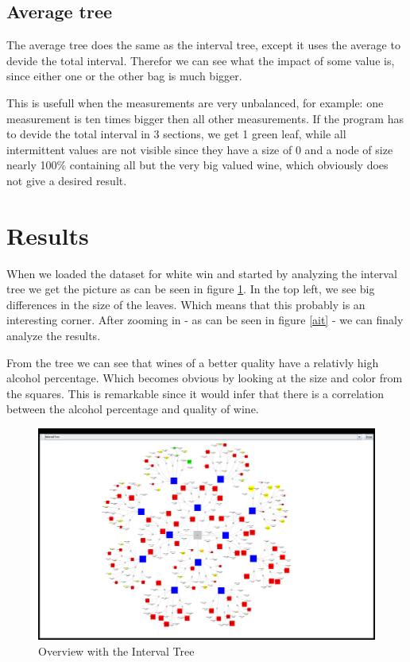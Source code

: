 \documentclass[a4paper,twoside,11pt]{article}
\begin{document}
\subsection{Average tree}
The average tree does the same as the interval tree, except it uses the average to devide the total interval. Therefor we can see what the impact of some value is, since either one or the other bag is much bigger.

This is usefull when the measurements are very unbalanced, for example: one measurement is ten times bigger then all other measurements. If the program has to devide the total interval in 3 sections, we get 1 green leaf, while all intermittent values are not visible since they have a size of 0 and a node of size nearly 100\% containing all but the very big valued wine, which obviously does not give a desired result.

\section{Results}
When we loaded the dataset for white win and started by analyzing the interval tree we get the picture as can be seen in figure \ref{oit}. In the top left, we see big differences in the size of the leaves. Which means that this probably is an interesting corner. After zooming in - as can be seen in figure \ref{ait} - we can finaly analyze the results.


From the tree we can see that wines of a better quality have a relativly high alcohol percentage. Which becomes obvious by looking at the size and color from the squares. This is remarkable since it would infer that there is a correlation between the alcohol percentage and quality of wine.

\begin{figure}[!h]
  \centering
  \includegraphics[width=\textwidth]{images/20131105033557plot.png}
  \caption{Overview with the Interval Tree}
  \label{oit}
\end{figure}
\end{document}
